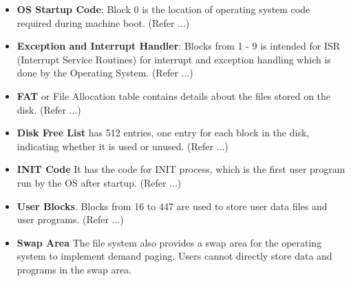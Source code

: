 \documentclass[11pt]{article}
\begin{document}
\begin{itemize}
\item \textbf{OS Startup Code}: Block 0 is the location of operating system code required during machine boot. (Refer ...)
\item \textbf{Exception and Interrupt Handler}: Blocks from 1 - 9 is intended for ISR (Interrupt Service Routines) for interrupt and exception handling which is done by the Operating System.  (Refer ...)
\item \textbf{FAT} or File Allocation table contains details about the files stored on the disk. (Refer ...)
\item \textbf{Disk Free List} has 512 entries, one entry for each block in the disk, indicating whether it is used or unused. (Refer ...)
\item \textbf{INIT Code} It has the code for INIT process, which is the first user program run by the OS after startup. (Refer ...) 
\item \textbf{User Blocks}. Blocks from 16 to 447 are used to store user data files and user programs. (Refer ...)
\item \textbf{Swap Area} The file system also provides a swap area for the operating system to implement demand paging. Users cannot directly store data and programs in the swap area.

\end{itemize}
\end{document}
